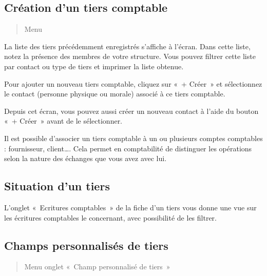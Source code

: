\documentclass[a4paper,10pt,oneside,french]{sphinxmanual}
\begin{document}
\subsection{Création d’un tiers comptable}
\label{\detokenize{accounting/third:creation-d-un-tiers-comptable}}\begin{quote}

Menu 
\end{quote}

\noindent{}

La liste des tiers précédemment enregistrés s’affiche à l’écran. Dans cette liste, notez la présence des membres de votre structure.
Vous pouvez filtrer cette liste par contact ou type de tiers et imprimer la liste obtenue.

Pour ajouter un nouveau tiers comptable, cliquez sur « + Créer » et sélectionnez le contact (personne physique ou morale) associé à ce tiers comptable.

\noindent{}

Depuis cet écran, vous pouvez aussi créer un nouveau contact à l’aide du bouton « + Créer » avant de le sélectionner.

\noindent{}

Il est possible d’associer un tiers comptable à un ou plusieurs comptes comptables : fournisseur, client…. Cela permet en comptabilité de distinguer les opérations selon la nature des échanges que vous avez avec lui.


\subsection{Situation d’un tiers}
\label{\detokenize{accounting/third:situation-d-un-tiers}}
L’onglet « Ecritures comptables » de la fiche d’un tiers vous donne une vue sur les écritures comptables le concernant,
avec possibilité de les filtrer.

\noindent{}


\subsection{Champs personnalisés de tiers}
\label{\detokenize{accounting/third:champs-personnalises-de-tiers}}\begin{quote}

Menu  \sphinxhyphen{} onglet « Champ personnalisé de tiers »
\end{quote}
\end{document}
